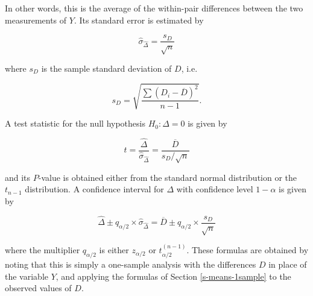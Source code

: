 \documentclass[11pt,a4paper,openany]{book}
\begin{document}
In other words, this is the average of the within-pair differences
between the two measurements of \(Y\). Its standard error is estimated
by

\begin{equation}\hat{\sigma}_{\hat{\Delta}} =
\frac{s_{D}}{\sqrt{n}}
\label{eq:sDbar-dep}\end{equation}

where \(s_{D}\) is the sample standard deviation of \(D\), i.e.

\begin{equation}s_{D} = \sqrt{\frac{\sum (D_{i}-\overline{D})^{2}}{n-1}}.
\label{eq:s2D-dep}\end{equation}

A test statistic for the null hypothesis \(H_{0}: \Delta=0\) is given by

\begin{equation}t=
\frac{\hat{\Delta}}{\hat{\sigma}_{\hat{\Delta}}}=
\frac{\overline{D}}{s_{D}/\sqrt{n}}
\label{eq:zD-dep}\end{equation}

and its \(P\)-value is obtained either from the standard normal
distribution or the \(t_{n-1}\) distribution. A confidence interval for
\(\Delta\) with confidence level \(1-\alpha\) is given by

\begin{equation}\hat{\Delta} \pm q_{\alpha/2} \times \hat{\sigma}_{\hat{\Delta}}
=\overline{D} \pm q_{\alpha/2} \times \frac{s_{D}}{\sqrt{n}}
\label{eq:ciD-dep}\end{equation}

where the multiplier \(q_{\alpha/2}\) is either \(z_{\alpha/2}\) or
\(t_{\alpha/2}^{(n-1)}\). These formulas are obtained by noting that
this is simply a one-sample analysis with the differences \(D\) in place
of the variable \(Y\), and applying the formulas of Section
\ref{s-means-1sample} to the observed values of \(D\).
\end{document}
